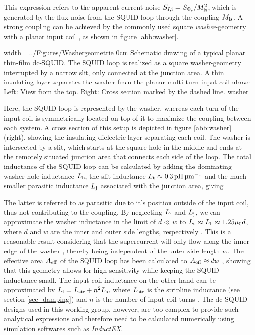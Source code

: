
This expression refers to the apparent current noise $S_{I\rm ,i}=S_{\rm \Phi_s}/M_{\rm is}^2$, which is generated by the flux noise from the SQUID loop through the coupling $M_{\rm is}$. A strong coupling can be achieved by the commonly used square \textit{washer}-geometry with a planar input coil \cite{Jaycox1981}, as shown in figure \ref{abb:washer}. 

{width=\textwidth}
{../Figures/Washergeometrie}
{0cm}   %
{Schematic drawing of a typical planar thin-film dc-SQUID. The SQUID loop is realized as a square washer-geometry interrupted by a narrow slit, only connected at the junction area. A thin insulating layer separates the washer from the planar multi-turn input coil above. Left: View from the top. Right: Cross section marked by the dashed line.}
{washer}

Here, the SQUID loop is represented by the washer, whereas each turn of the input coil is symmetrically located on top of it to maximize the coupling between each system. A cross section of this setup is depicted in figure \ref{abb:washer} (right), showing the insulating dielectric layer separating each coil. The washer is intersected by a slit, which starts at the square hole in the middle and ends at the remotely situated junction area that connects each side of the loop. The total inductance of the SQUID loop can be calculated by adding the dominating washer hole inductance $L_{\rm h}$, the slit inductance $L_{\rm t}\approx \qty{0.3}{\pH\per\um}$ and the much smaller parasitic inductance $L_{\rm j}$ associated with the junction area, giving \cite{Ketchen1991}


The latter is referred to as parasitic due to it's position outside of the input coil, thus not contributing to the coupling. By neglecting $L_{\rm t}$ and $L_{\rm j}$, we can approximate the washer inductance in the limit of $d\ll w$ to $L_{\rm s}\approx L_{\rm h}\approx 1.25{\rm\mu_0}d$, where $d$ and $w$ are the inner and outer side lengths, respectively \cite{Jaycox1981}. This is a reasonable result considering that the supercurrent will only flow along the inner edge of the washer \cite{Ketchen1982}, thereby being independent of the outer side length $w$. The effective area $A_{\rm eff}$ of the SQUID loop has been calculated to $A_{\rm eff}\approx dw$ \cite{Ketchen1985}, showing that this geometry allows for high sensitivity while keeping the SQUID inductance small. The input coil inductance on the other hand can be approximated by $L_{\rm i}=L_{\rm str}+n^2L_{\rm s}$, where $L_{\rm str}$ is the stripline inductance (see section \ref{sec_damping}) and $n$ is the number of input coil turns \cite{Jaycox1981}. The dc-SQUID designs used in this working group, however, are too complex to provide such analytical expressions and therefore need to be calculated numerically using simulation softwares such as \textit{InductEX}. 

